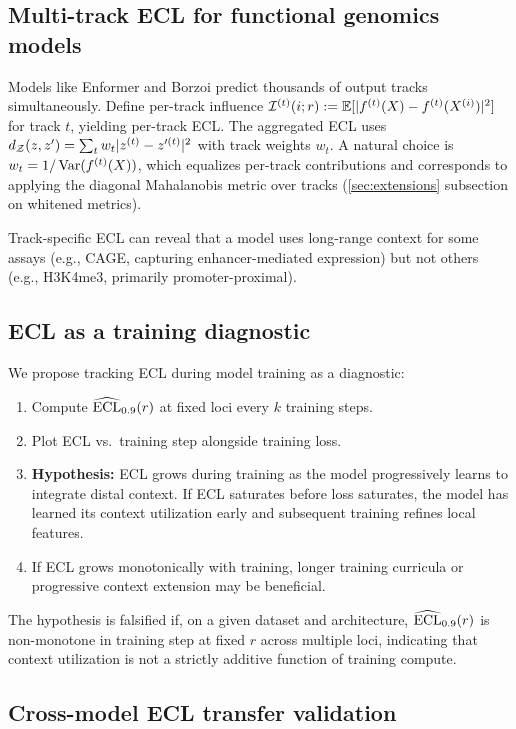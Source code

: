 \subsection{Multi-track ECL for functional genomics models}

Models like Enformer and Borzoi predict thousands of output tracks simultaneously. Define per-track influence $\mathcal{I}^{(t)}(i;r) := \mathbb{E}[|f^{(t)}(X) - f^{(t)}(X^{(i)})|^2]$ for track $t$, yielding per-track ECL. The aggregated ECL uses $d_{\mathcal{Z}}(z,z') = \sum_t w_t |z^{(t)} - z'^{(t)}|^2$ with track weights $w_t$. A natural choice is $w_t = 1/\operatorname{Var}(f^{(t)}(X))$, which equalizes per-track contributions and corresponds to applying the diagonal Mahalanobis metric over tracks (\cref{sec:extensions} subsection on whitened metrics).

Track-specific ECL can reveal that a model uses long-range context for some assays (e.g., CAGE, capturing enhancer-mediated expression) but not others (e.g., H3K4me3, primarily promoter-proximal).

\subsection{ECL as a training diagnostic}

We propose tracking ECL during model training as a diagnostic:
\begin{enumerate}[leftmargin=2em, label=(\roman*)]
\item Compute $\widehat{\mathrm{ECL}}_{0.9}(r)$ at fixed loci every $k$ training steps.
\item Plot ECL vs.\ training step alongside training loss.
\item \textbf{Hypothesis:} ECL grows during training as the model progressively learns to integrate distal context. If ECL saturates before loss saturates, the model has learned its context utilization early and subsequent training refines local features.
\item If ECL grows monotonically with training, longer training curricula or progressive context extension may be beneficial.
\end{enumerate}
The hypothesis is falsified if, on a given dataset and architecture, $\widehat{\mathrm{ECL}}_{0.9}(r)$ is non-monotone in training step at fixed $r$ across multiple loci, indicating that context utilization is not a strictly additive function of training compute.

\subsection{Cross-model ECL transfer validation}

